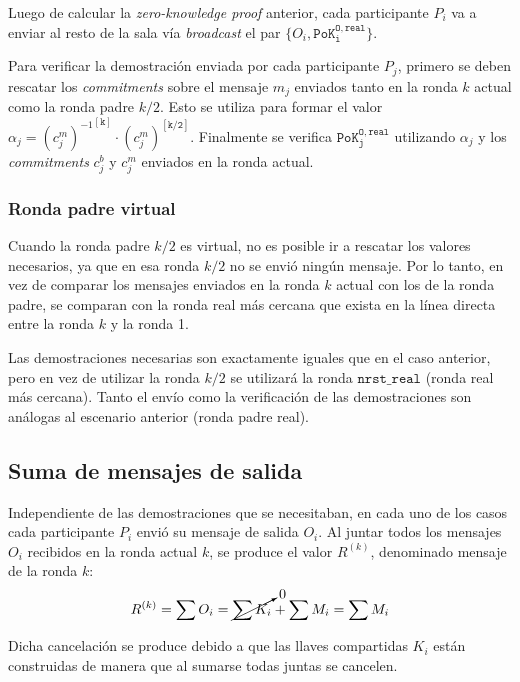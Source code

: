 Luego de calcular la \emph{zero-knowledge proof} anterior, cada participante $P_i$ va a 
enviar al resto de la sala vía \emph{broadcast} el par $\{O_i, \mathtt{PoK_i^{O, real}}\}$.

Para verificar la demostración enviada por cada participante $P_j$, primero se deben 
rescatar los \emph{commitments} sobre el mensaje $m_j$ enviados tanto en la ronda $k$ 
actual como la ronda padre $k/2$. Esto se utiliza para formar el valor 
$\alpha_j = {(c_j^m)^{-1}}^\mathtt{[k]} \cdot {(c_j^m)}^\mathtt{[k/2]}$. 
Finalmente se verifica $\mathtt{PoK_j^{O, real}}$ utilizando $\alpha_j$ y los 
\emph{commitments} $c_j^b$ y $c_j^m$ enviados en la ronda actual.

\subsubsection{Ronda padre virtual}

Cuando la ronda padre $k/2$ es virtual, no es posible ir a rescatar los valores 
necesarios, ya que en esa ronda $k/2$ no se envió ningún mensaje. Por lo tanto, 
en vez de comparar los mensajes enviados en la ronda $k$ actual con los de la 
ronda padre, se comparan con la ronda real más cercana que exista en la línea 
directa entre la ronda $k$ y la ronda 1. 


Las demostraciones necesarias son exactamente iguales que en el caso anterior, 
pero en vez de utilizar la ronda $k/2$ se utilizará la ronda $\mathtt{nrst\_real}$ 
(ronda real más cercana). Tanto el envío como la verificación de las demostraciones 
son análogas al escenario anterior (ronda padre real).

\subsection{Suma de mensajes de salida}

Independiente de las demostraciones que se necesitaban, en cada uno de los casos 
cada participante $P_i$ envió su mensaje de salida $O_i$. Al juntar todos los 
mensajes $O_i$ recibidos en la ronda actual $k$, se produce el valor $R^{(k)}$, 
denominado mensaje de la ronda 
$k$: $$R^{(k)} = \sum O_i = \cancelto{0}{\sum K_i} + \sum M_i = \sum M_i$$

Dicha cancelación se produce debido a que las llaves compartidas $K_i$ están 
construidas de manera que al sumarse todas juntas se cancelen.

